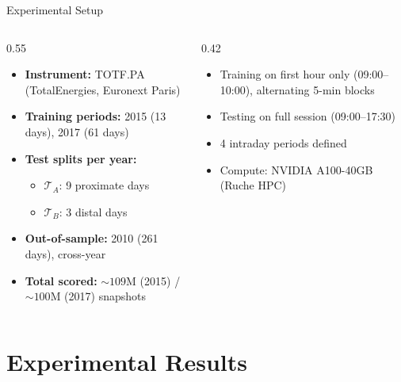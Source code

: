 \documentclass{beamer}
\begin{document}
\begin{frame}{Experimental Setup}
    \begin{columns}[T]
    \begin{column}{0.55\textwidth}
    \begin{itemize}
        \item \textbf{Instrument:} TOTF.PA (TotalEnergies, Euronext Paris)
        \item \textbf{Training periods:} 2015 (13 days), 2017 (61 days)
        \item \textbf{Test splits per year:}
            \begin{itemize}
                \item $\mathcal{T}_A$: 9 proximate days
                \item $\mathcal{T}_B$: 3 distal days
            \end{itemize}
        \item \textbf{Out-of-sample:} 2010 (261 days), cross-year
        \item \textbf{Total scored:} ${\sim}109$M (2015) / ${\sim}100$M (2017) snapshots
    \end{itemize}
    \end{column}
    \begin{column}{0.42\textwidth}
    \begin{itemize}
        \item Training on first hour only (09:00--10:00), alternating 5-min blocks
        \item Testing on full session (09:00--17:30)
        \item 4 intraday periods defined
        \item Compute: NVIDIA A100-40GB (Ruche HPC)
    \end{itemize}
    \end{column}
    \end{columns}
\end{frame}


\section{Experimental Results}
\end{document}
